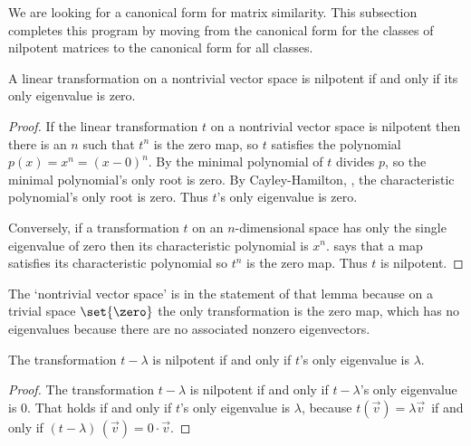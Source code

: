 











We are looking for a canonical form for matrix similarity.
This subsection completes this program by moving
from the canonical form for the classes 
of nilpotent matrices to
the canonical form for all classes.

\begin{lemma} \label{le:NilIffOnlyEigenZero}
A linear transformation on a nontrivial vector space 
is nilpotent if and only if its only eigenvalue is zero.
\end{lemma}

\begin{proof}
If the linear transformation $t$ on a nontrivial vector space
is nilpotent then there 
is an $n$ such that $t^n$ is the zero map,
so $t$ satisfies the polynomial $p(x)=x^n=(x-0)^n$.
By  the minimal polynomial of 
$t$ divides $p$, so the minimal polynomial's only root is zero.
By Cayley-Hamilton, ,
the characteristic polynomial's only root is zero.
Thus $t$'s only eigenvalue is zero.

Conversely, if a transformation \( t \) on an
\( n \)-dimensional space has only the single eigenvalue of zero 
then its characteristic polynomial is \( x^n \). 
 says that a map satisfies its
characteristic polynomial so \( t^n \) is the zero map.
Thus $t$ is nilpotent.
\end{proof}

\noindent The `nontrivial vector space' is in the statement of 
that lemma because on a trivial
space $\set{\zero}$ the only transformation is the zero map, which has
no eigenvalues because there are no associated nonzero eigenvectors.

\begin{corollary} \label{cor:tMinLambdaNilpotent}
The transformation $t-\lambda$ is nilpotent if and only if 
$t$'s only eigenvalue is $\lambda$.   
\end{corollary}

\begin{proof}
The transformation \( t-\lambda \) is nilpotent if and only if
$t-\lambda$'s only eigenvalue is \( 0 \).
That holds if and only if $t$'s only eigenvalue is $\lambda$, because
\( t(\vec{v})=\lambda\vec{v} \,\) if and 
only if \( (t-\lambda)\,(\vec{v})=0\cdot\vec{v} \).
\end{proof}

